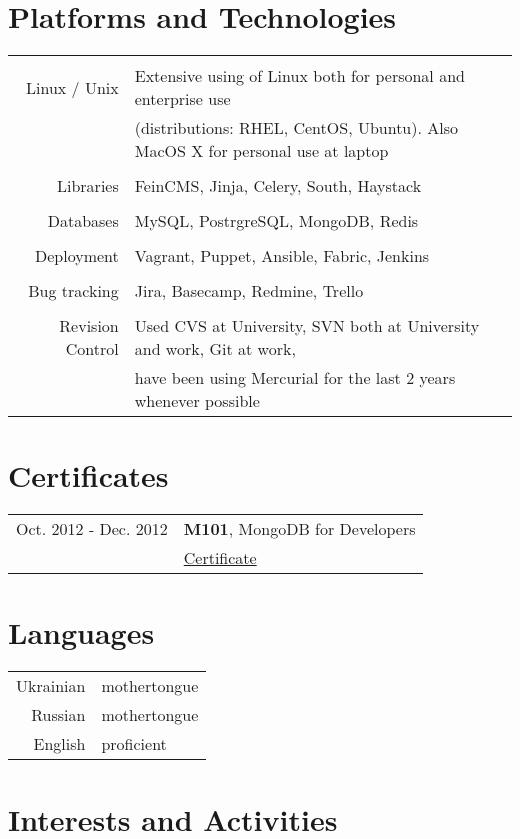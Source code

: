 \documentclass[a4paper,10pt]{article}
\begin{document}
\section{Platforms and Technologies}
 \begin{tabular}{r|p{11cm}}
 \multicolumn{2}{c}{} \\
  Linux / Unix & Extensive using of Linux both for personal and enterprise use \\
  & (distributions: RHEL, CentOS, Ubuntu). Also MacOS X for personal use at laptop \\
 \multicolumn{2}{c}{} \\
  Libraries & FeinCMS, Jinja, Celery, South, Haystack \\
 \multicolumn{2}{c}{} \\
  Databases & MySQL, PostrgreSQL, MongoDB, Redis \\
 \multicolumn{2}{c}{} \\
  Deployment & Vagrant, Puppet, Ansible, Fabric, Jenkins \\
 \multicolumn{2}{c}{} \\
  Bug tracking & Jira, Basecamp, Redmine, Trello \\
 \multicolumn{2}{c}{} \\
  Revision Control & Used CVS at University, SVN both at University and work,  Git at work, \\
  & have been using Mercurial for the last 2 years whenever possible \\
 \end{tabular}

 \section{Certificates}
 \begin{tabular}{rl}
  Oct. 2012 - Dec. 2012 & \textbf{M101}, MongoDB for Developers\\
  & \href{https://s3.amazonaws.com/edu-cert.10gen.com/downloads/8381fb4e8cff46cc82353a3ecea5a070/Certificate.pdf}{Certificate} \\	
 \end{tabular}

 \section{Languages}
 \begin{tabular}{rl}
  Ukrainian & mothertongue \\
  Russian & mothertongue \\
  English & proficient \\
 \end{tabular}

\section{Interests and Activities}
\end{document}
